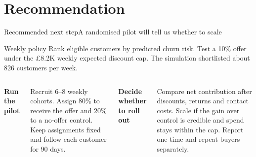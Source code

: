 \section{Recommendation}

\begin{frame}{Recommended next step}{A randomised pilot will tell us whether to scale}
  \vspace{0.2cm}
  \begin{block}{Weekly policy}
    Rank eligible customers by predicted churn risk. Test a 10\% offer under the \pounds8.2K weekly expected discount cap. The simulation shortlisted about 826 customers per week.
  \end{block}
  \vspace{0.3cm}
  \begin{columns}[T]
    {\large\bfseries Run the pilot\par}
    \vspace{6pt}
    {Recruit 6--8 weekly cohorts. Assign 80\% to receive the offer and 20\% to a no-offer control. Keep assignments fixed and follow each customer for 90 days.\par}
    {\large\bfseries Decide whether to roll out\par}
    \vspace{6pt}
    {Compare net contribution after discounts, returns and contact costs. Scale if the gain over control is credible and spend stays within the cap. Report one-time and repeat buyers separately.\par}
  \end{columns}
\end{frame}
